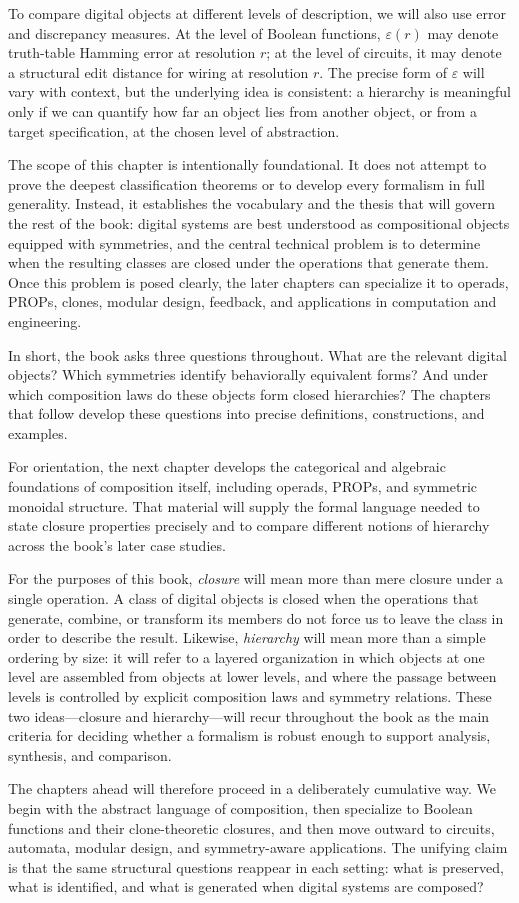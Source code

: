 \documentclass[11pt]{article}
\begin{document}
To compare digital objects at different levels of description, we will also use error and discrepancy measures. At the level of Boolean functions, \(\varepsilon(r)\) may denote truth-table Hamming error at resolution \(r\); at the level of circuits, it may denote a structural edit distance for wiring at resolution \(r\). The precise form of \(\varepsilon\) will vary with context, but the underlying idea is consistent: a hierarchy is meaningful only if we can quantify how far an object lies from another object, or from a target specification, at the chosen level of abstraction.

The scope of this chapter is intentionally foundational. It does not attempt to prove the deepest classification theorems or to develop every formalism in full generality. Instead, it establishes the vocabulary and the thesis that will govern the rest of the book: digital systems are best understood as compositional objects equipped with symmetries, and the central technical problem is to determine when the resulting classes are closed under the operations that generate them. Once this problem is posed clearly, the later chapters can specialize it to operads, PROPs, clones, modular design, feedback, and applications in computation and engineering.

In short, the book asks three questions throughout. What are the relevant digital objects? Which symmetries identify behaviorally equivalent forms? And under which composition laws do these objects form closed hierarchies? The chapters that follow develop these questions into precise definitions, constructions, and examples.

For orientation, the next chapter develops the categorical and algebraic foundations of composition itself, including operads, PROPs, and symmetric monoidal structure. That material will supply the formal language needed to state closure properties precisely and to compare different notions of hierarchy across the book's later case studies.

For the purposes of this book, \emph{closure} will mean more than mere closure under a single operation. A class of digital objects is closed when the operations that generate, combine, or transform its members do not force us to leave the class in order to describe the result. Likewise, \emph{hierarchy} will mean more than a simple ordering by size: it will refer to a layered organization in which objects at one level are assembled from objects at lower levels, and where the passage between levels is controlled by explicit composition laws and symmetry relations. These two ideas---closure and hierarchy---will recur throughout the book as the main criteria for deciding whether a formalism is robust enough to support analysis, synthesis, and comparison.

The chapters ahead will therefore proceed in a deliberately cumulative way. We begin with the abstract language of composition, then specialize to Boolean functions and their clone-theoretic closures, and then move outward to circuits, automata, modular design, and symmetry-aware applications. The unifying claim is that the same structural questions reappear in each setting: what is preserved, what is identified, and what is generated when digital systems are composed?
\end{document}
